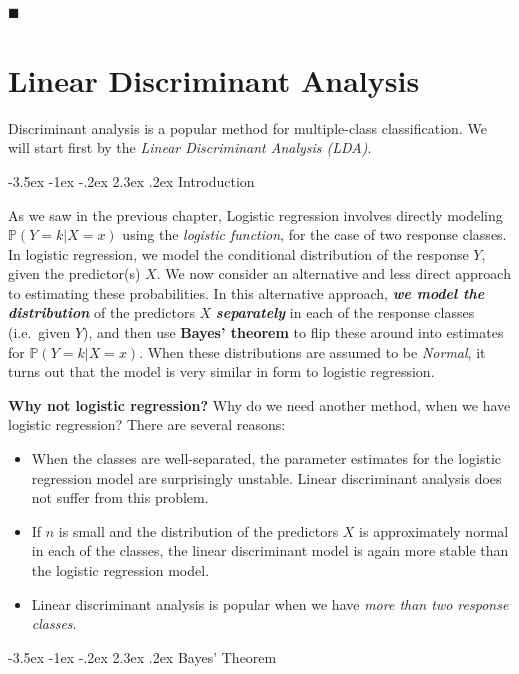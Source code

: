 \documentclass[]{book}
\makeatletter
\providecommand{\tightlist}{%
  \setlength{\itemsep}{0pt}\setlength{\parskip}{0pt}}
\renewcommand\section{\@startsection {section}{1}{\z@}%
                                   {-3.5ex \@plus -1ex \@minus -.2ex}%
                                   {2.3ex \@plus.2ex}%
                                   {\normalfont\Large\bfseries\color{ForestGreen}}}
\theoremstyle{definition}
\theoremstyle{definition}
\theoremstyle{definition}
\theoremstyle{remark}
\makeatother
\begin{document}
◼

\chapter{Linear Discriminant
Analysis}\label{linear-discriminant-analysis}

Discriminant analysis is a popular method for multiple-class
classiﬁcation. We will start first by the \emph{Linear Discriminant
Analysis (LDA)}.

\section{Introduction}\label{introduction-2}

As we saw in the previous chapter, Logistic regression involves directly
modeling \(\mathbb{P} (Y = k|X = x)\) using the \emph{logistic
function}, for the case of two response classes. In logistic regression,
we model the conditional distribution of the response \(Y\), given the
predictor(s) \(X\). We now consider an alternative and less direct
approach to estimating these probabilities. In this alternative
approach, \textbf{\emph{we model the distribution}} of the predictors
\(X\) \textbf{\emph{separately}} in each of the response classes
(i.e.~given \(Y\)), and then use \textbf{Bayes' theorem} to flip these
around into estimates for \(\mathbb{P} (Y = k|X = x)\). When these
distributions are assumed to be \emph{Normal}, it turns out that the
model is very similar in form to logistic regression.

\textbf{Why not logistic regression?} Why do we need another method,
when we have logistic regression? There are several reasons:

\begin{itemize}
\tightlist
\item
  When the classes are well-separated, the parameter estimates for the
  logistic regression model are surprisingly unstable. Linear
  discriminant analysis does not suﬀer from this problem.
\item
  If \(n\) is small and the distribution of the predictors \(X\) is
  approximately normal in each of the classes, the linear discriminant
  model is again more stable than the logistic regression model.
\item
  Linear discriminant analysis is popular when we have \emph{more than
  two response classes}.
\end{itemize}

\section{Bayes' Theorem}\label{bayes-theorem}
\end{document}
